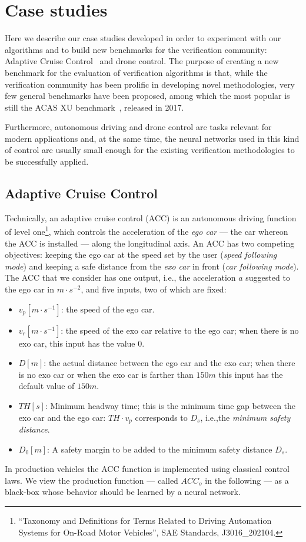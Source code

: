 \section{Case studies}
\label{sec:nn-exp_case}

Here we describe our case studies developed in order to experiment with
our algorithms and to build new benchmarks for the verification community:
Adaptive Cruise Control~\cite{DBLP:conf/ecms/DemarchiGPT22} and drone
control.
The purpose of creating a new benchmark for the evaluation of verification 
algorithms is that, while the verification community has been prolific in 
developing novel methodologies, very few general benchmarks have been proposed,
among which the most popular is still the ACAS XU 
benchmark~\cite{DBLP:conf/cav/KatzBDJK17}, released in 2017.

Furthermore, autonomous driving and drone control are tasks relevant for modern
applications and, at the same time, the neural networks used in this kind of 
control are usually small enough for the existing verification methodologies 
to be successfully applied. 

\subsection{Adaptive Cruise Control}

Technically, an adaptive cruise control (ACC) is an autonomous driving
function of level one\footnote{``Taxonomy and Definitions for Terms
	Related to Driving Automation Systems for On-Road Motor Vehicles'',
	SAE Standards, J3016\_202104.}, which controls the
acceleration of the \emph{ego car} --- the car whereon the ACC is
installed --- along the longitudinal axis. An ACC has two competing
objectives: keeping 
the ego car at the speed set by the user (\textit{speed following
	mode}) and keeping a safe distance from the \emph{exo car} in front
(\textit{car following mode}). The ACC that we consider has one
output, i.e., the acceleration $a$ suggested to the ego car in
$m \cdot s^{-2}$, and five inputs, two of which are fixed:
%
\begin{itemize}
	\item $v_p [m \cdot s^{-1}]$: the speed of the ego car.
	\item $v_r [m \cdot s^{-1}]$: the speed of the exo car relative to
	the ego car; when there is no exo car, this input has the value
	$0$.  
	\item $D [m]$: the actual distance between the ego car and the exo
	car; when there is no exo car or when the exo car is farther than
	$150m$ this input has the default value of $150m$.  
	\item $TH [s]$: Minimum headway time; this is the minimum
	time gap between the exo car and the ego car: $TH \cdot
	v_p$ corresponds to $D_s$, i.e.,the \emph{minimum safety
		distance}.
	\item $D_0 [m]$: A safety margin to be added to the minimum safety
	distance $D_s$.
\end{itemize}
%
In production vehicles the ACC function is implemented using classical
control laws. We view the production function --- called $ACC_{o}$
in the following --- as a black-box whose behavior should be learned
by a neural network.

